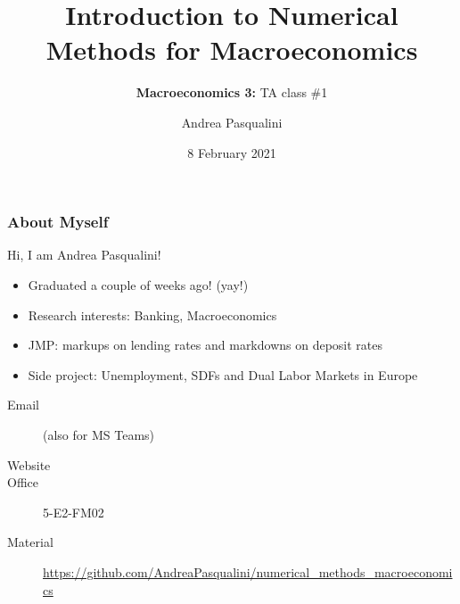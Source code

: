 \documentclass[10pt, aspectratio=1610, handout]{beamer}
\title[Intro to Numerical Methods for Macro]{
  \textbf{Introduction to Numerical Methods for Macroeconomics}
}
\subtitle[Macro 3: TA\#1]{
  \textbf{Macroeconomics 3:} TA class \#1
}
\author[A.~Pasqualini]{
  Andrea Pasqualini
}
\institute[Bocconi]{Bocconi University}
\date{
  8 February 2021
}
\begin{document}
  \begin{frame}
    \maketitle
  \end{frame}

  \begin{frame}
    \frametitle{About Myself}

    Hi, I am Andrea Pasqualini!

    \vfill\pause

    \begin{itemize}
      \item Graduated a couple of weeks ago! (yay!)
      \item Research interests: Banking, Macroeconomics
      \item JMP: markups on lending rates and markdowns on deposit rates
      \item Side project: Unemployment, SDFs and Dual Labor Markets in Europe
    \end{itemize}

    \vfill\pause

    \begin{description}
      \item[Email]  (also for MS Teams)
      \item[Website] 
      \item[Office] 5-E2-FM02
      \item[Material] \href{https://github.com/AndreaPasqualini/numerical_methods_macroeconomics}{https://github.com/AndreaPasqualini/numerical\_methods\_macroeconomics}
    \end{description}

  \end{frame}
\end{document}
